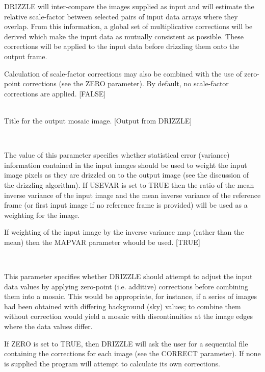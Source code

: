 \documentclass[twoside,11pt]{article}
\renewcommand{\_}{\texttt{\symbol{95}}}
\newcommand{\sstsubsection}[1]{ \item[{#1}] \mbox{} \\}
\newcommand{\sstsubsection}[1]{\item[{#1}]}
\begin{document}
{{{         DRIZZLE will inter-compare the images supplied as input and will
         estimate the relative scale-factor between selected pairs of
         input data arrays where they overlap.  From this information,
         a global set of multiplicative corrections will be derived which
         make the input data as mutually consistent as possible. These
         corrections will be applied to the input data before drizzling
         them onto the output frame.

         Calculation of scale-factor corrections may also be combined
         with the use of zero-point corrections (see the ZERO
         parameter). By default, no scale-factor corrections are
         applied.
         [FALSE]
      }
      \sstsubsection{
         TITLE = LITERAL (Read)
      }{
         Title for the output mosaic image.
         [Output from DRIZZLE]
      }
      \sstsubsection{
         USEVAR = \_LOGICAL (Read)
      }{
         The value of this parameter specifies whether statistical
         error (variance) information contained in the input images
         should be used to weight the input image pixels as they
         are drizzled on to the output image (see the discussion of the
         drizzling algorithm). If USEVAR is set to TRUE then the
         ratio of the mean inverse variance of the input image and
         the mean inverse variance of the reference frame (or first
         input image if no reference frame is provided) will be used as
         a weighting for the image.

         If weighting of the input image by the inverse variance map
         (rather than the mean) then the MAPVAR parameter whould be used.
         [TRUE]
      }
      \sstsubsection{
         ZERO = \_LOGICAL (Read)
      }{
         This parameter specifies whether DRIZZLE should attempt to
         adjust the input data values by applying zero-point (i.e.
         additive) corrections before combining them into a mosaic.
         This would be appropriate, for instance, if a series of images
         had been obtained with differing background (sky) values; to
         combine them without correction would yield a mosaic with
         discontinuities at the image edges where the data values
         differ.

         If ZERO is set to TRUE, then DRIZZLE will ask the user for a
         sequential file containing the corrections for each image (see
         the CORRECT parameter). If none is supplied the program will
         attempt to calculate its own corrections.

}}}
\end{document}

